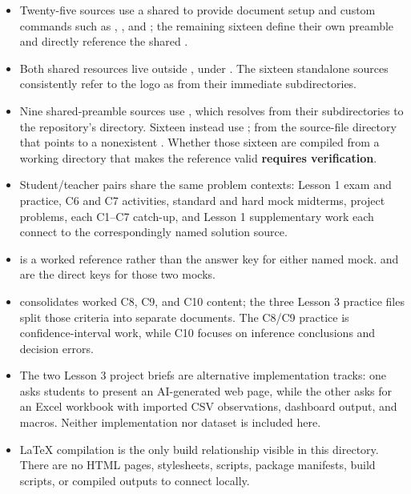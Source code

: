 \begin{itemize}
\item Twenty-five sources use a shared  to provide document setup and custom commands such as , , and ; the remaining sixteen define their own  preamble and directly reference the shared .
\item Both shared resources live outside , under . The sixteen standalone sources consistently refer to the logo as  from their immediate subdirectories.
\item Nine shared-preamble sources use , which resolves from their subdirectories to the repository's  directory. Sixteen instead use ; from the source-file directory that points to a nonexistent . Whether those sixteen are compiled from a working directory that makes the reference valid \textbf{requires verification}.
\item Student/teacher pairs share the same problem contexts: Lesson 1 exam and practice, C6 and C7 activities, standard and hard mock midterms, project problems, each C1–C7 catch-up, and Lesson 1 supplementary work each connect to the correspondingly named solution source.
\item {} is a worked reference rather than the answer key for either named mock.  and  are the direct keys for those two mocks.
\item {} consolidates worked C8, C9, and C10 content; the three Lesson 3 practice files split those criteria into separate documents. The C8/C9 practice is confidence-interval work, while C10 focuses on inference conclusions and decision errors.
\item The two Lesson 3 project briefs are alternative implementation tracks: one asks students to present an AI-generated web page, while the other asks for an Excel workbook with imported CSV observations, dashboard output, and macros. Neither implementation nor dataset is included here.
\item LaTeX compilation is the only build relationship visible in this directory. There are no HTML pages, stylesheets, scripts, package manifests, build scripts, or compiled outputs to connect locally.
\end{itemize}

